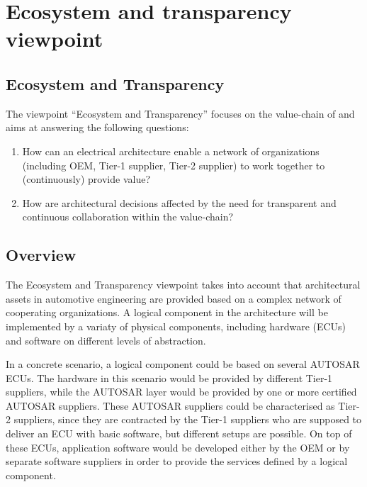 \section{Ecosystem and transparency viewpoint}\label{sec:ET_VP}
\renewcommand{\Fillin}[1]{{Ecosystem and Transparency}}
\subsection{\Fillin{Viewpoint Name}}\label{vp:eco}


The viewpoint ``\Fillin{Viewpoint Name}'' focuses on the value-chain of  and aims at answering the following questions:
\begin{enumerate}
\item How can an electrical architecture enable a network of organizations (including OEM, Tier-1 supplier, Tier-2 supplier) to work together to (continuously) provide value?
\item How are architectural decisions affected by the need for transparent and continuous collaboration within the value-chain?
\end{enumerate}

\subsection{Overview} 


The \Fillin{Viewpoint Name} viewpoint takes into account that architectural assets in automotive engineering are provided based on a complex network of cooperating organizations. 
A logical component in the architecture will be implemented by a variaty of physical components, including hardware (ECUs) and software on different levels of abstraction. 

In a concrete scenario, a logical component could be based on several AUTOSAR ECUs.
The hardware in this scenario would be provided by different Tier-1 suppliers, while the AUTOSAR layer would be provided by one or more certified AUTOSAR suppliers.
These AUTOSAR suppliers could be characterised as Tier-2 suppliers, since they are contracted by the Tier-1 suppliers who are supposed to deliver an ECU with basic software, but different setups are possible. 
On top of these ECUs, application software would be developed either by the OEM or by separate software suppliers in order to provide the services defined by a logical component. 

